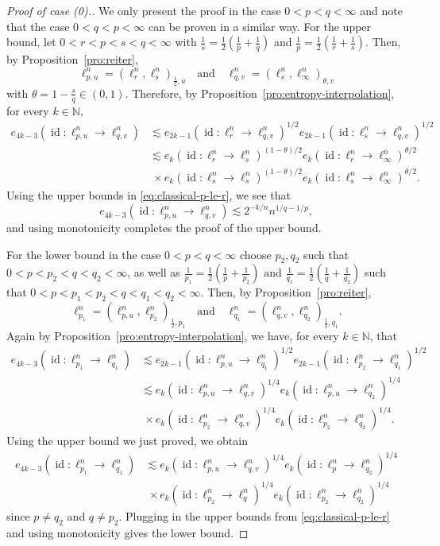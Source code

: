 \documentclass[a4paper,12pt]{article}
\theoremstyle{definition}
\newcommand{\IN}{\mathbb{N}}
\DeclareMathOperator{\id}{id}
\begin{document}
\begin{proof}[Proof of case (0).]
We only present the proof in the case $0<p<q< \infty$ and note that the case $0<q<p< \infty$ can be proven in a similar way.  For the upper bound, let $0<r<p<s<q< \infty$ with $\frac{1}{s}=\frac{1}{2}(\frac{1}{p}+\frac{1}{q})$ and $\frac{1}{p}=\frac{1}{2}(\frac{1}{r}+\frac{1}{s})$. Then, by Proposition~\ref{pro:reiter},
\[
\ell_{p,u}^n=(\ell_{r}^n,\ell_{s}^n)_{\frac{1}{2},u} \quad \text{and}\quad\ell_{q,v}^n=(\ell_{s}^n,\ell_{\infty}^n)_{\theta,v}
\]
with $\theta=1-\frac{s}{q}\in (0,1)$. Therefore, by Proposition~\ref{pro:entropy-interpolation}, for every $k\in\IN$,
\begin{align*}
e_{4k-3}(\id\colon \ell_{p,u}^n\to \ell_{q,v}^n)
&\lesssim e_{2k-1}(\id\colon \ell_r^n\to \ell_{q,v}^n)^{1/2}e_{2k-1}(\id\colon \ell_s^n\to \ell_{q,v}^n)^{1/2}\\
&\lesssim e_k(\id\colon \ell_r^n\to \ell_{s}^n)^{(1-\theta)/2}e_k(\id\colon \ell_r^n\to \ell_{\infty}^n)^{\theta/2}\\
&\ \times e_k(\id\colon \ell_s^n\to \ell_{s}^n)^{(1-\theta)/2}e_k(\id\colon \ell_s^n\to \ell_{\infty}^n)^{\theta/2}.
\end{align*}
Using the upper bounds in \eqref{eq:classical-p-le-r}, we see that 
\[
e_{4k-3}(\id\colon \ell_{p,u}^n\to \ell_{q,v}^n)\lesssim 2^{-k/n}n^{1/q-1/p},
\]
and using monotonicity completes the proof of the upper bound. 

For the lower bound in the case $0<p<q<\infty$ choose $p_2,q_2$ such that $0<p<p_2<q<q_2<\infty$, as well as
$
\frac{1}{p_1}=\frac{1}{2}(\frac{1}{p}+\frac{1}{p_2})\text{ and }\frac{1}{q_1}=\frac{1}{2}(\frac{1}{q}+\frac{1}{q_2})
$ 
such that $0<p<p_1<p_2<q<q_1<q_2<\infty$. Then, by Proposition~\ref{pro:reiter},
\[
\ell_{p_1}^n=(\ell_{p,u}^n,\ell_{p_2}^n)_{\frac{1}{2},p_1} \quad \text{and}\quad\ell_{q_1}^n=(\ell_{q,v}^n,\ell_{q_2}^n)_{\frac{1}{2},q_1}.
\]
Again by Proposition~\ref{pro:entropy-interpolation}, we have, for every $k\in\IN$, that
\begin{align*}
e_{4k-3}(\id\colon \ell_{p_1}^n\to \ell_{q_1}^n)
&\lesssim e_{2k-1}(\id\colon \ell_{p,u}^n\to \ell_{q_1}^n)^{1/2}e_{2k-1}(\id\colon \ell_{p_2}^n\to \ell_{q_1}^n)^{1/2}\\
&\lesssim e_k(\id\colon \ell_{p,u}^n\to \ell_{q,v}^n)^{1/4}e_k(\id\colon \ell_{p,u}^n\to \ell_{q_2}^n)^{1/4}\\
&\ \times e_k(\id\colon \ell_{p_2}^n\to \ell_{q,v}^n)^{1/4}e_k(\id\colon \ell_{p_2}^n\to \ell_{q_2}^n)^{1/4}.
\end{align*}
Using the upper bound we just proved, we obtain 
\begin{align*}
e_{4k-3}(\id\colon \ell_{p_1}^n\to \ell_{q_1}^n)
&\lesssim e_k(\id\colon \ell_{p,u}^n\to \ell_{q,v}^n)^{1/4}e_k(\id\colon \ell_{p}^n\to \ell_{q_2}^n)^{1/4}\\
&\ \times e_k(\id\colon \ell_{p_2}^n\to \ell_{q}^n)^{1/4}e_k(\id\colon \ell_{p_2}^n\to \ell_{q_2}^n)^{1/4}
\end{align*}
since $p\neq q_2$ and $q\neq p_2$. Plugging in the upper bounds from \eqref{eq:classical-p-le-r} and using monotonicity gives the lower bound.
\end{proof}
\end{document}
